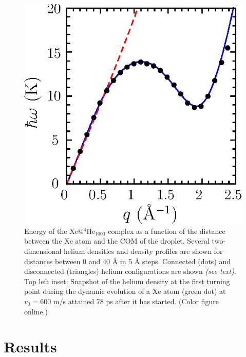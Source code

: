 		\begin{figure}[!] 
			\includegraphics[width=1.0\linewidth,clip=true]{fig1}
			\caption{ \label{fig1-headon} Energy of the Xe@$^4$He$_{1000}$ complex as a function of the distance between  the Xe atom and the  COM of the droplet. Several two-dimensional helium densities and density profiles are shown for distances between 0 and 40 \AA{} in 5  \AA{} steps. Connected (dots) and disconnected (triangles) helium configurations are shown \emph{(see text)}. Top left inset: Snapshot of the helium density at the first turning point  during the dynamic evolution of a Xe atom (green dot) at $v_0 = 600$ m/s attained  78 ps after it has started. (Color figure online.)}
		\end{figure}

	\section{Results}

